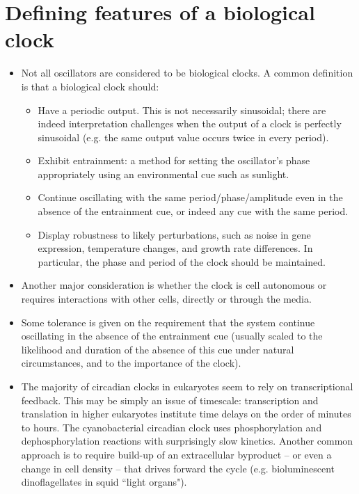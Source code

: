 \documentclass{article}
\begin{document}
\section*{Defining features of a biological clock}

\begin{itemize}
\item Not all oscillators are considered to be biological clocks. A common definition is that a biological clock should:

\begin{itemize}
\item Have a periodic output. This is not necessarily sinusoidal; there are indeed interpretation challenges when the output of a clock is perfectly sinusoidal (e.g. the same output value occurs twice in every period).
\item Exhibit entrainment: a method for setting the oscillator's phase appropriately using an environmental cue such as sunlight.
\item Continue oscillating with the same period/phase/amplitude even in the absence of the entrainment cue, or indeed any cue with the same period.
\item Display robustness to likely perturbations, such as noise in gene expression, temperature changes, and growth rate differences. In particular, the phase and period of the clock should be maintained.
\end{itemize}

\item Another major consideration is whether the clock is cell autonomous or requires interactions with other cells, directly or through the media.

\item Some tolerance is given on the requirement that the system continue oscillating in the absence of the entrainment cue (usually scaled to the likelihood and duration of the absence of this cue under natural circumstances, and to the importance of the clock).

\item The majority of circadian clocks in eukaryotes seem to rely on transcriptional feedback. This may be simply an issue of timescale: transcription and translation in higher eukaryotes institute time delays on the order of minutes to hours. The cyanobacterial circadian clock uses phosphorylation and dephosphorylation reactions with surprisingly slow kinetics. Another common approach is to require build-up of an extracellular byproduct -- or even a change in cell density -- that drives forward the cycle (e.g. bioluminescent dinoflagellates in squid ``light organs").

\end{itemize}
\end{document}
